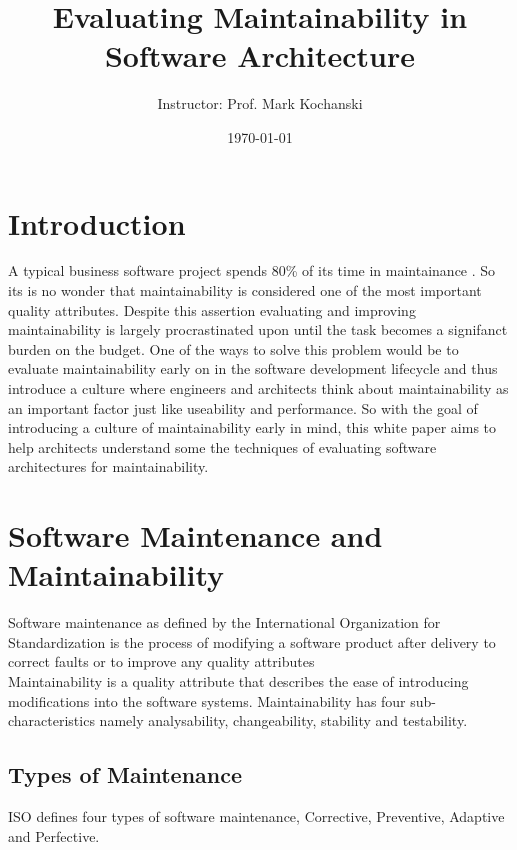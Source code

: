 \documentclass[dvips,12pt]{article}
\title{Evaluating Maintainability in Software Architecture}
\author{\Author \and
Instructor: Prof. Mark Kochanski}
\date{\today}
\begin{document}



\maketitle
\newpage

\section{Introduction}
A typical business software project spends 80\% of its time in maintainance \cite{pigoski_practical_1996}. So its is no wonder that maintainability is considered one of the most important quality attributes. Despite this assertion evaluating and improving maintainability is largely procrastinated upon until the task becomes a signifanct burden on the budget. One of the ways to solve this problem would be to evaluate maintainability early on in the software development lifecycle and thus introduce a culture where engineers and architects think about maintainability as an important factor just like useability and performance. So with the goal of introducing a culture of maintainability early in mind, this white paper aims to help architects understand some the techniques of evaluating software architectures for maintainability.


\section{Software Maintenance and Maintainability}
Software maintenance as defined by the International Organization for Standardization is the process of modifying a software product after delivery to correct faults or to improve any quality attributes \cite{_international_2006} \\

Maintainability is a quality attribute that describes the ease of introducing modifications into the software systems. Maintainability has four sub-characteristics namely analysability, changeability, stability and testability\cite{_international_2006}.\\

\subsection{Types of Maintenance}
ISO defines four types of software maintenance, Corrective, Preventive, Adaptive and Perfective. \\
\end{document}
